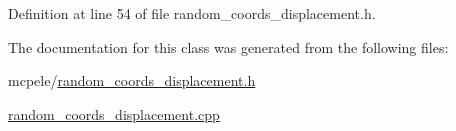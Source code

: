 \-Definition at line 54 of file random\-\_\-coords\-\_\-displacement.\-h.



\-The documentation for this class was generated from the following files\-:\begin{DoxyCompactItemize}
\item 
mcpele/\hyperlink{random__coords__displacement_8h}{random\-\_\-coords\-\_\-displacement.\-h}\item 
\hyperlink{random__coords__displacement_8cpp}{random\-\_\-coords\-\_\-displacement.\-cpp}\end{DoxyCompactItemize}
